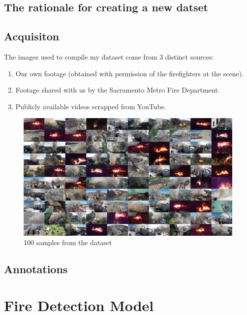   \subsection{The rationale for creating a new datset}


  \subsection{Acquisiton}

  The images used to compile my dataset come from 3 distinct sources:
  \begin{enumerate}
    \item Our own footage (obtained with permission of the firefighters at the scene).
    \item Footage shared with us by the Sacramento Metro Fire Department.
    \item Publicly available videos scrapped from YouTube.
  \end{enumerate}

  \begin{figure}
    \includegraphics[width=\linewidth]{figures/lowres_100tiles.jpg}
    \caption{100 samples from the dataset}
  \end{figure}

  \subsection{Annotations}

\section{Fire Detection Model}\label{sec:detection}

